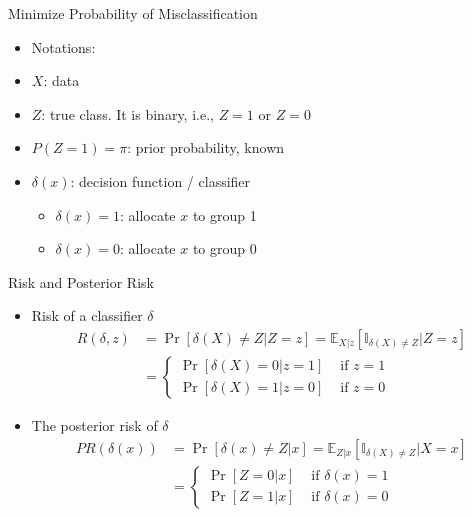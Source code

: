\documentclass[
  ignorenonframetext,
]{beamer}
\providecommand{\tightlist}{%
  \setlength{\itemsep}{0pt}\setlength{\parskip}{0pt}}
\begin{document}
\begin{frame}{Minimize Probability of Misclassification}
\begin{itemize}
\tightlist
\item
  Notations:
\item
  \(X\): data
\item
  \(Z\): true class. It is binary, i.e., \(Z=1\) or \(Z=0\)
\item
  \(P(Z=1)=\pi\): prior probability, known
\item
  \(\delta(x)\): decision function / classifier

  \begin{itemize}
  \tightlist
  \item
    \(\delta(x)=1\): allocate \(x\) to group 1
  \item
    \(\delta(x)=0\): allocate \(x\) to group 0
  \end{itemize}
\end{itemize}
\end{frame}

\begin{frame}{Risk and Posterior Risk}
\protect\hypertarget{risk-and-posterior-risk}{}
\begin{itemize}
\item
  Risk of a classifier \(\delta\) \[\begin{aligned}
  R(\delta, z)&=\Pr [\delta(X)\not= Z|Z=z]=\mathbb E_{X|z} [\mathbb I_{\delta(X)\not= Z}|Z=z]\\
  &=\left\{
  \begin{array}{cc}
  \Pr[\delta(X)=0|z=1] & \mbox{ if } z=1\\
  \Pr[\delta(X)=1|z=0] & \mbox{ if } z=0
  \end{array}\right.
  \end{aligned}\]
\item
  The posterior risk of \(\delta\) \[\begin{aligned}
  PR(\delta(x)) &= \Pr[\delta(x)\not= Z|x]=\mathbb E_{Z|x} [\mathbb I_{\delta(X)\not= Z}|X=x]\\
  &=\left\{
  \begin{array}{cc}
  \Pr[Z=0|x] & \mbox{ if } \delta(x)=1\\
  \Pr[Z=1|x] & \mbox{ if } \delta(x)=0
  \end{array}\right.
  \end{aligned}\]
\end{itemize}
\end{frame}
\end{document}
